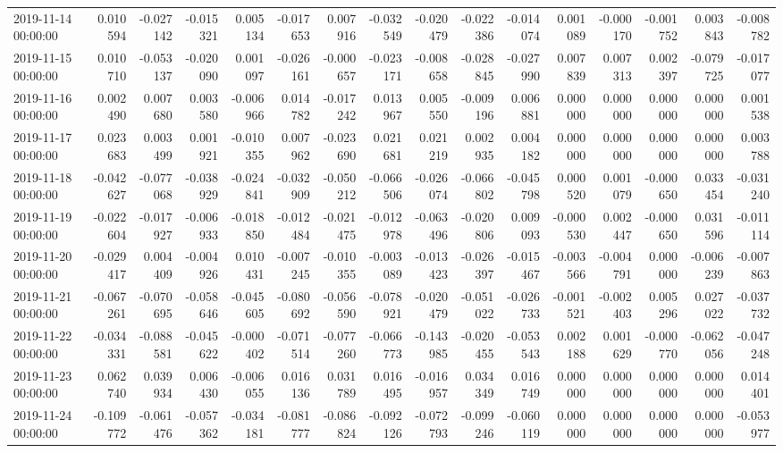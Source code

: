 \begin{tabular}{lrrrrrrrrrrrrrrr}
2019-11-14 00:00:00 & 0.010594 & -0.027142 & -0.015321 & 0.005134 & -0.017653 & 0.007916 & -0.032549 & -0.020479 & -0.022386 & -0.014074 & 0.001089 & -0.000170 & -0.001752 & 0.003843 & -0.008782 \\
2019-11-15 00:00:00 & 0.010710 & -0.053137 & -0.020090 & 0.001097 & -0.026161 & -0.000657 & -0.023171 & -0.008658 & -0.028845 & -0.027990 & 0.007839 & 0.007313 & 0.002397 & -0.079725 & -0.017077 \\
2019-11-16 00:00:00 & 0.002490 & 0.007680 & 0.003580 & -0.006966 & 0.014782 & -0.017242 & 0.013967 & 0.005550 & -0.009196 & 0.006881 & 0.000000 & 0.000000 & 0.000000 & 0.000000 & 0.001538 \\
2019-11-17 00:00:00 & 0.023683 & 0.003499 & 0.001921 & -0.010355 & 0.007962 & -0.023690 & 0.021681 & 0.021219 & 0.002935 & 0.004182 & 0.000000 & 0.000000 & 0.000000 & 0.000000 & 0.003788 \\
2019-11-18 00:00:00 & -0.042627 & -0.077068 & -0.038929 & -0.024841 & -0.032909 & -0.050212 & -0.066506 & -0.026074 & -0.066802 & -0.045798 & 0.000520 & 0.001079 & -0.000650 & 0.033454 & -0.031240 \\
2019-11-19 00:00:00 & -0.022604 & -0.017927 & -0.006933 & -0.018850 & -0.012484 & -0.021475 & -0.012978 & -0.063496 & -0.020806 & 0.009093 & -0.000530 & 0.002447 & -0.000650 & 0.031596 & -0.011114 \\
2019-11-20 00:00:00 & -0.029417 & 0.004409 & -0.004926 & 0.010431 & -0.007245 & -0.010355 & -0.003089 & -0.013423 & -0.026397 & -0.015467 & -0.003566 & -0.004791 & 0.000000 & -0.006239 & -0.007863 \\
2019-11-21 00:00:00 & -0.067261 & -0.070695 & -0.058646 & -0.045605 & -0.080692 & -0.056590 & -0.078921 & -0.020479 & -0.051022 & -0.026733 & -0.001521 & -0.002403 & 0.005296 & 0.027022 & -0.037732 \\
2019-11-22 00:00:00 & -0.034331 & -0.088581 & -0.045622 & -0.000402 & -0.071514 & -0.077260 & -0.066773 & -0.143985 & -0.020455 & -0.053543 & 0.002188 & 0.001629 & -0.000770 & -0.062056 & -0.047248 \\
2019-11-23 00:00:00 & 0.062740 & 0.039934 & 0.006430 & -0.006055 & 0.016136 & 0.031789 & 0.016495 & -0.016957 & 0.034349 & 0.016749 & 0.000000 & 0.000000 & 0.000000 & 0.000000 & 0.014401 \\
2019-11-24 00:00:00 & -0.109772 & -0.061476 & -0.057362 & -0.034181 & -0.081777 & -0.086824 & -0.092126 & -0.072793 & -0.099246 & -0.060119 & 0.000000 & 0.000000 & 0.000000 & 0.000000 & -0.053977 \\

\end{tabular}
